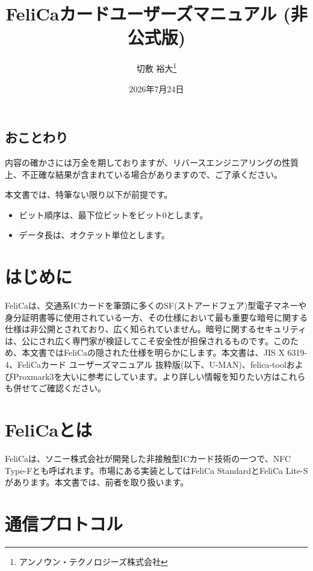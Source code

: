 \documentclass[a4paper]{report}
\title{FeliCaカードユーザーズマニュアル (非公式版)}
\author{切敷 裕大\thanks{アンノウン・テクノロジーズ株式会社}}
\date{2026年7月24日}
\begin{document}
\maketitle

\section*{おことわり}

内容の確かさには万全を期しておりますが、リバースエンジニアリングの性質上、不正確な結果が含まれている場合がありますので、ご了承ください。

本文書では、特筆ない限り以下が前提です。

\begin{itemize}
    \item ビット順序は、最下位ビットをビット0とします。
    \item データ長は、オクテット単位とします。
\end{itemize}

\tableofcontents

\chapter{はじめに}

FeliCaは、交通系ICカードを筆頭に多くのSF(ストアードフェア)型電子マネーや身分証明書等に使用されている一方、その仕様において最も重要な暗号に関する仕様は非公開とされており、広く知られていません。暗号に関するセキュリティは、公にされ広く専門家が検証してこそ安全性が担保されるものです。このため、本文書ではFeliCaの隠された仕様を明らかにします。本文書は、JIS X 6319-4\cite{jis-x-6319-4-2016}、FeliCaカード ユーザーズマニュアル 抜粋版(以下、U-MAN)\cite{felica-usersmanual}、felica-tool\cite{felica-tool}およびProxmark3\cite{proxmark3}を大いに参考にしています。より詳しい情報を知りたい方はこれらも併せてご確認ください。

\chapter{FeliCaとは}

FeliCaは、ソニー株式会社が開発した非接触型ICカード技術の一つで、NFC Type-Fとも呼ばれます。市場にある実装としてはFeliCa StandardとFeliCa Lite-Sがあります。本文書では、前者を取り扱います。

\chapter{通信プロトコル}
\end{document}
